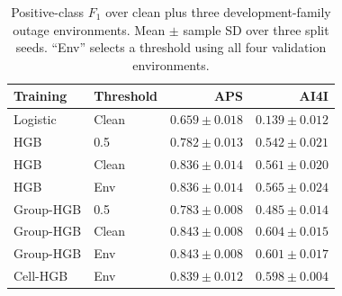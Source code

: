 \begin{table}[t]\centering\caption{Positive-class $F_1$ over clean plus three development-family outage environments. Mean $\pm$ sample SD over three split seeds. ``Env'' selects a threshold using all four validation environments.}\label{tab:ablation}\small
\begin{tabular}{llrr}\hline
Training & Threshold & APS & AI4I\\\hline
Logistic & Clean & $0.659\pm0.018$ & $0.139\pm0.012$\\
HGB & 0.5 & $0.782\pm0.013$ & $0.542\pm0.021$\\
HGB & Clean & $0.836\pm0.014$ & $0.561\pm0.020$\\
HGB & Env & $0.836\pm0.014$ & $0.565\pm0.024$\\
Group-HGB & 0.5 & $0.783\pm0.008$ & $0.485\pm0.014$\\
Group-HGB & Clean & $0.843\pm0.008$ & $0.604\pm0.015$\\
Group-HGB & Env & $0.843\pm0.008$ & $0.601\pm0.017$\\
Cell-HGB & Env & $0.839\pm0.012$ & $0.598\pm0.004$\\
\hline\end{tabular}\end{table}

